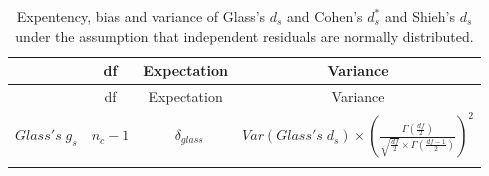 \documentclass[
  english,
  man,floatsintext]{apa6}
\begin{document}
\newpage
\begin{landscape}

\begin{longtable}[]{@{}lccc@{}}
\caption{Expentency, bias and variance of Glass's \(d_s\) and Cohen's \(d^*_s\) and Shieh's \(d_s\) under the assumption that independent residuals are normally distributed.}\tabularnewline
\toprule
\begin{minipage}[b]{0.10\columnwidth}\raggedright
\strut
\end{minipage} & \begin{minipage}[b]{0.18\columnwidth}\centering
df\strut
\end{minipage} & \begin{minipage}[b]{0.16\columnwidth}\centering
Expectation\strut
\end{minipage} & \begin{minipage}[b]{0.45\columnwidth}\centering
Variance\strut
\end{minipage}\tabularnewline
\midrule
\endfirsthead
\toprule
\begin{minipage}[b]{0.10\columnwidth}\raggedright
\strut
\end{minipage} & \begin{minipage}[b]{0.18\columnwidth}\centering
df\strut
\end{minipage} & \begin{minipage}[b]{0.16\columnwidth}\centering
Expectation\strut
\end{minipage} & \begin{minipage}[b]{0.45\columnwidth}\centering
Variance\strut
\end{minipage}\tabularnewline
\midrule
\endhead
\begin{minipage}[t]{0.10\columnwidth}\raggedright
\(Glass's \; g_s\)\strut
\end{minipage} & \begin{minipage}[t]{0.18\columnwidth}\centering
\(n_c-1\)\strut
\end{minipage} & \begin{minipage}[t]{0.16\columnwidth}\centering
~\(\delta_{glass}\)\strut
\end{minipage} & \begin{minipage}[t]{0.45\columnwidth}\centering
\(Var(Glass's \; d_s) \times \left( \frac{\Gamma\left(\frac{df}{2} \right)}{\sqrt{\frac{df}{2}} \times \Gamma \left( \frac{df-1}{2}\right)}\right)^2\)\strut
\end{minipage}\tabularnewline
\begin{minipage}[t]{0.10\columnwidth}\raggedright

\end{minipage}
\end{longtable}
\end{landscape}
\end{document}
